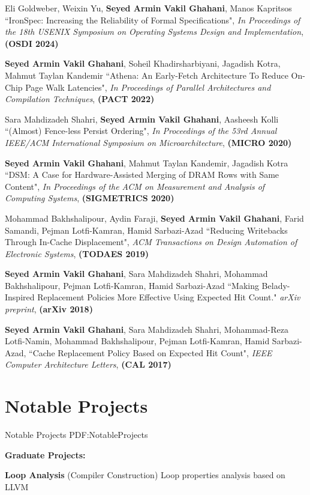\documentclass[a4paper,9pt,oneside]{article}
\begin{document}
\begin{body}
\BulletItem
Eli Goldweber,
Weixin Yu,
\textbf{Seyed Armin Vakil Ghahani},
Manos Kapritsos
``{IronSpec}: Increasing the Reliability of Formal Specifications", \textit{In Proceedings of the 18th USENIX Symposium on Operating Systems Design and Implementation}, \textbf{(OSDI 2024)}

\BulletItem
\textbf{Seyed Armin Vakil Ghahani},
Soheil Khadirsharbiyani,
Jagadish Kotra,
Mahmut Taylan Kandemir
``Athena: An Early-Fetch Architecture To Reduce On-Chip Page Walk Latencies", \textit{In Proceedings of Parallel Architectures and Compilation Techniques}, \textbf{(PACT 2022)}

\BulletItem
Sara Mahdizadeh Shahri,
\textbf{Seyed Armin Vakil Ghahani},
Aasheesh Kolli
``(Almost) Fence-less Persist Ordering", \textit{In Proceedings of the 53rd Annual IEEE/ACM International Symposium on Microarchitecture}, \textbf{(MICRO 2020)}

\BulletItem
\textbf{Seyed Armin Vakil Ghahani},
Mahmut Taylan Kandemir,
Jagadish Kotra
``DSM: A Case for Hardware-Assisted Merging of DRAM Rows with Same Content", \textit{In Proceedings of the ACM on Measurement and Analysis of Computing Systems}, \textbf{(SIGMETRICS 2020)}

\BulletItem
Mohammad Bakhshalipour,
Aydin Faraji,
\textbf{Seyed Armin Vakil Ghahani},
Farid Samandi,
Pejman Lotfi-Kamran,
Hamid Sarbazi-Azad
``Reducing Writebacks Through In-Cache Displacement", \textit{ACM Transactions on Design Automation of Electronic Systems}, \textbf{(TODAES 2019)}

\BulletItem
\textbf{Seyed Armin Vakil Ghahani},
Sara Mahdizadeh Shahri,
Mohammad Bakhshalipour,
Pejman Lotfi-Kamran,
Hamid Sarbazi-Azad
``Making Belady-Inspired Replacement Policies More Effective Using Expected Hit Count." \textit{arXiv preprint}, \textbf{(arXiv 2018)}


\BulletItem
\textbf{Seyed Armin Vakil Ghahani},
Sara Mahdizadeh Shahri,
Mohammad-Reza Lotfi-Namin,
Mohammad Bakhshalipour,
Pejman Lotfi-Kamran,
Hamid Sarbazi-Azad,
``Cache Replacement Policy Based on Expected Hit Count", \textit{IEEE Computer Architecture Letters}, \textbf{(CAL 2017)}

\section
{Notable Projects}
{Notable Projects}
{PDF:NotableProjects}

\textbf{Graduate Projects:}

\BulletItem
\textbf{Loop Analysis}
(Compiler Construction)
\hfill
{}
\SubBulletItem
Loop properties analysis based on LLVM


\end{body}
\end{document}

